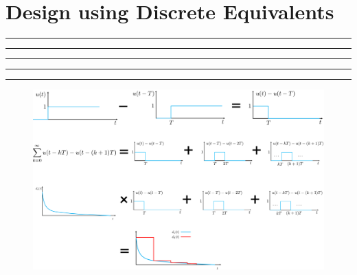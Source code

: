 \setcounter{chapter}{7}
\setcounter{section}{2}
\section{Design using Discrete Equivalents}
\vspace{-8pt} \hrule \hrule \hrule \hrule \hrule  \vspace{12pt}
		\begin{figure}[!h]
			\centering
			\includegraphics[width=23cm]{./FIG_Franklin/fig8-smc8.png}
		\end{figure}